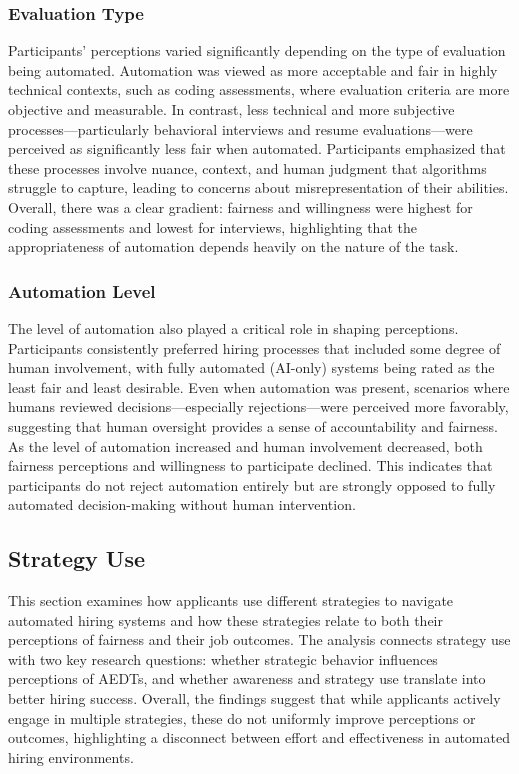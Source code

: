 \subsubsection{Evaluation Type}
Participants' perceptions varied significantly depending on the type of evaluation being automated. Automation was viewed as more acceptable and fair in highly technical contexts, such as coding assessments, where evaluation criteria are more objective and measurable. In contrast, less technical and more subjective processes—particularly behavioral interviews and resume evaluations—were perceived as significantly less fair when automated. Participants emphasized that these processes involve nuance, context, and human judgment that algorithms struggle to capture, leading to concerns about misrepresentation of their abilities. Overall, there was a clear gradient: fairness and willingness were highest for coding assessments and lowest for interviews, highlighting that the appropriateness of automation depends heavily on the nature of the task.

\subsubsection{Automation Level}

The level of automation also played a critical role in shaping perceptions. Participants consistently preferred hiring processes that included some degree of human involvement, with fully automated (AI-only) systems being rated as the least fair and least desirable. Even when automation was present, scenarios where humans reviewed decisions—especially rejections—were perceived more favorably, suggesting that human oversight provides a sense of accountability and fairness. As the level of automation increased and human involvement decreased, both fairness perceptions and willingness to participate declined. This indicates that participants do not reject automation entirely but are strongly opposed to fully automated decision-making without human intervention.

\subsection{Strategy Use}
This section examines how applicants use different strategies to navigate automated hiring systems and how these strategies relate to both their perceptions of fairness and their job outcomes. The analysis connects strategy use with two key research questions: whether strategic behavior influences perceptions of AEDTs, and whether awareness and strategy use translate into better hiring success. Overall, the findings suggest that while applicants actively engage in multiple strategies, these do not uniformly improve perceptions or outcomes, highlighting a disconnect between effort and effectiveness in automated hiring environments.

